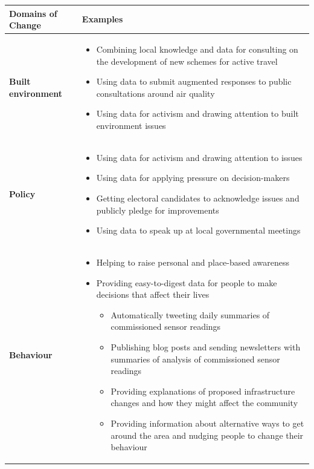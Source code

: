 \begin{table}[ht!]
\scriptsize
\centering
\begin{tabular}{|>{\centering\arraybackslash}m{3cm}|m{120mm}|}
\hline
\textbf{Domains of Change} & \textbf{Examples} \\ [0.5ex]
\hline
\textbf{Built environment}	& 
        \begin{itemize}
            \item Combining local knowledge and data for consulting on the development of new schemes for active travel
            \item Using data to submit augmented responses to public consultations around air quality
            \item Using data for activism and drawing attention to built environment issues
        \end{itemize} \\
\hline
\textbf{Policy} &  
        \begin{itemize}
            \item Using data for activism and drawing attention to issues
            \item Using data for applying pressure on decision-makers
            \item Getting electoral candidates to acknowledge issues and publicly pledge for improvements
            \item Using data to speak up at local governmental meetings
        \end{itemize} \\
\hline
\textbf{Behaviour} & 
        \begin{itemize}
            \item Helping to raise personal and place-based awareness
            \item Providing easy-to-digest data for people to make decisions that affect their lives
                \begin{itemize}
                    \item Automatically tweeting daily summaries of commissioned sensor readings
                    \item Publishing blog posts and sending newsletters with summaries of analysis of commissioned sensor readings
                    \item Providing explanations of proposed infrastructure changes and how they might affect the community
                    \item Providing information about alternative ways to get around the area and nudging people to change their behaviour

\end{itemize}
\end{itemize}
\end{tabular}
\end{table}
